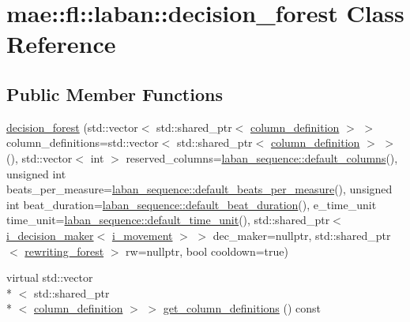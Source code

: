 \hypertarget{classmae_1_1fl_1_1laban_1_1decision__forest}{\section{mae\-:\-:fl\-:\-:laban\-:\-:decision\-\_\-forest Class Reference}
\label{classmae_1_1fl_1_1laban_1_1decision__forest}
}
\subsection*{Public Member Functions}
\begin{DoxyCompactItemize}
\item 
\hyperlink{classmae_1_1fl_1_1laban_1_1decision__forest_ac3373a7eb4c88665e58f83cdccbf6512}{decision\-\_\-forest} (std\-::vector$<$ std\-::shared\-\_\-ptr$<$ \hyperlink{classmae_1_1fl_1_1laban_1_1column__definition}{column\-\_\-definition} $>$ $>$ column\-\_\-definitions=std\-::vector$<$ std\-::shared\-\_\-ptr$<$ \hyperlink{classmae_1_1fl_1_1laban_1_1column__definition}{column\-\_\-definition} $>$ $>$(), std\-::vector$<$ int $>$ reserved\-\_\-columns=\hyperlink{classmae_1_1fl_1_1laban_1_1laban__sequence_adda43b657712484d90b4ef3927a81128}{laban\-\_\-sequence\-::default\-\_\-columns}(), unsigned int beats\-\_\-per\-\_\-measure=\hyperlink{classmae_1_1fl_1_1laban_1_1laban__sequence_a2e64362d5cfeb89eb8545cb064e63170}{laban\-\_\-sequence\-::default\-\_\-beats\-\_\-per\-\_\-measure}(), unsigned int beat\-\_\-duration=\hyperlink{classmae_1_1fl_1_1laban_1_1laban__sequence_ac7bf04cdac0c3aed6b8ee4a887e561d9}{laban\-\_\-sequence\-::default\-\_\-beat\-\_\-duration}(), e\-\_\-time\-\_\-unit time\-\_\-unit=\hyperlink{classmae_1_1fl_1_1laban_1_1laban__sequence_ada28215d43d85e983fe6129e9816eed2}{laban\-\_\-sequence\-::default\-\_\-time\-\_\-unit}(), std\-::shared\-\_\-ptr$<$ \hyperlink{classmae_1_1fl_1_1laban_1_1i__decision__maker}{i\-\_\-decision\-\_\-maker}$<$ \hyperlink{classmae_1_1fl_1_1laban_1_1i__movement}{i\-\_\-movement} $>$ $>$ dec\-\_\-maker=nullptr, std\-::shared\-\_\-ptr$<$ \hyperlink{classmae_1_1fl_1_1laban_1_1rewriting__forest}{rewriting\-\_\-forest} $>$ rw=nullptr, bool cooldown=true)
\item 
virtual std\-::vector\\*
$<$ std\-::shared\-\_\-ptr\\*
$<$ \hyperlink{classmae_1_1fl_1_1laban_1_1column__definition}{column\-\_\-definition} $>$ $>$ \hyperlink{classmae_1_1fl_1_1laban_1_1decision__forest_a775eff8eefb5d8291148f79e233a31b2}{get\-\_\-column\-\_\-definitions} () const 

\end{DoxyCompactItemize}
